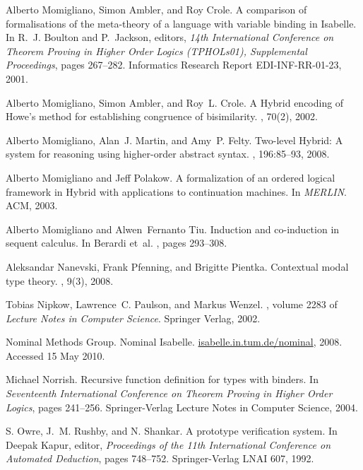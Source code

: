 \documentclass[final]{svjour3}
\begin{document}
\begin{thebibliography}{100}
Alberto Momigliano, Simon Ambler, and Roy Crole.
\newblock A comparison of formalisations of the meta-theory of a language with
  variable binding in {I}sabelle.
\newblock In R.~J. Boulton and P.~Jackson, editors, {\em 14th International
  Conference on Theorem Proving in Higher Order Logics (TPHOLs01), Supplemental
  Proceedings}, pages 267--282. Informatics Research Report EDI-INF-RR-01-23,
  2001.

Alberto Momigliano, Simon Ambler, and Roy~L. Crole.
\newblock A {H}ybrid encoding of {H}owe's method for establishing congruence of
  bisimilarity.
, 70(2), 2002.

Alberto Momigliano, Alan~J. Martin, and Amy~P. Felty.
\newblock Two-level {H}ybrid: {A} system for reasoning using higher-order
  abstract syntax.
, 196:85--93, 2008.

Alberto Momigliano and Jeff Polakow.
\newblock A formalization of an ordered logical framework in {H}ybrid with
  applications to continuation machines.
\newblock In {\em MERLIN}. ACM, 2003.

Alberto Momigliano and Alwen~Fernanto Tiu.
\newblock Induction and co-induction in sequent calculus.
\newblock In Berardi et~al. \cite{DBLP:conf/types/2003}, pages 293--308.

Aleksandar Nanevski, Frank Pfenning, and Brigitte Pientka.
\newblock Contextual modal type theory.
, 9(3), 2008.

Tobias Nipkow, Lawrence~C. Paulson, and Markus Wenzel.
,
  volume 2283 of {\em Lecture Notes in Computer Science}.
\newblock Springer Verlag, 2002.

{Nominal Methods Group}.
\newblock Nominal {Isabelle}.
\newblock \url{isabelle.in.tum.de/nominal}, 2008. Accessed 15 May 2010.

Michael Norrish.
\newblock Recursive function definition for types with binders.
\newblock In {\em Seventeenth International Conference on Theorem Proving in
  Higher Order Logics}, pages 241--256. Springer-Verlag Lecture Notes in
  Computer Science, 2004.

{S.} Owre, {J.}~{M.} Rushby, and {N.} Shankar.
 {A} prototype verification system.
\newblock In Deepak Kapur, editor, {\em Proceedings of the 11th International
  Conference on Automated Deduction}, pages 748--752. Springer-Verlag LNAI 607,
  1992.


\end{thebibliography}
\end{document}
